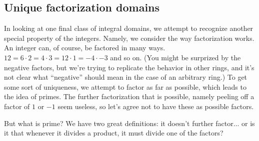 \documentclass[12pt]{article}
\begin{document}
\subsection{Unique factorization domains}
\label{sec:uniq-fact-doma}

In looking at one final class of integral domains, we attempt to
recognize another special property of the integers. Namely, we
consider the way factorization works. An integer can, of course, be
factored in many ways. $12=6\cdot 2=4\cdot 3 = 12\cdot 1=-4\cdot -3$ and so
on. (You might be surprized by the negative factors, but we're trying
to replicate the behavior in other rings, and it's not clear what
``negative'' should mean in the case of an arbitrary ring.) To get
some sort of uniqueness, we attempt to factor as far as possible,
which leads to the idea of primes. The further factorization that is
possible, namely peeling off a factor of $1$ or $-1$ seem useless, so
let's agree not to have these as possible factors.

But what is prime? We have two great definitions: it doesn't further
factor... or is it that whenever it divides a product, it must divide
one of the factors? 
\end{document}
